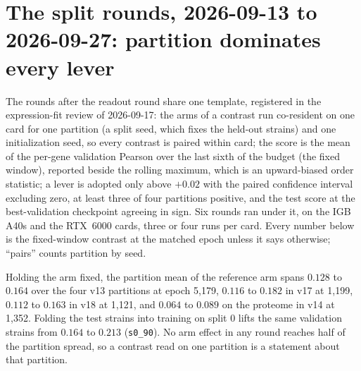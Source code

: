 
\section{The split rounds, 2026-09-13 to 2026-09-27: partition dominates every lever}
\label{sec:split-rounds}

The rounds after the readout round share one template, registered in the expression-fit
review of 2026-09-17: the arms of a contrast run co-resident on one card for one partition
(a split seed, which fixes the held-out strains) and one initialization seed, so every
contrast is paired within card; the score is the mean of the per-gene validation Pearson
over the last sixth of the budget (the fixed window), reported beside the rolling maximum,
which is an upward-biased order statistic; a lever is adopted only above $+0.02$ with the
paired confidence interval excluding zero, at least three of four partitions positive, and
the test score at the best-validation checkpoint agreeing in sign. Six rounds ran under it,
on the IGB  A40s and the  RTX~6000 cards, three or four runs per card.
Every number below is the fixed-window contrast at the matched epoch unless it says
otherwise; ``pairs'' counts partition by seed.

 Holding the arm fixed, the
partition mean of the reference arm spans $0.128$ to $0.164$ over the four v13 partitions
at epoch 5{,}179, $0.116$ to $0.182$ in v17 at 1{,}199, $0.112$ to $0.163$ in v18 at
1{,}121, and $0.064$ to $0.089$ on the proteome in v14 at 1{,}352. Folding the test strains
into training on split 0 lifts the same validation strains from $0.164$ to $0.213$
(\texttt{s0\_90}). No arm effect in any round reaches half of the partition spread, so a
contrast read on one partition is a statement about that partition.


